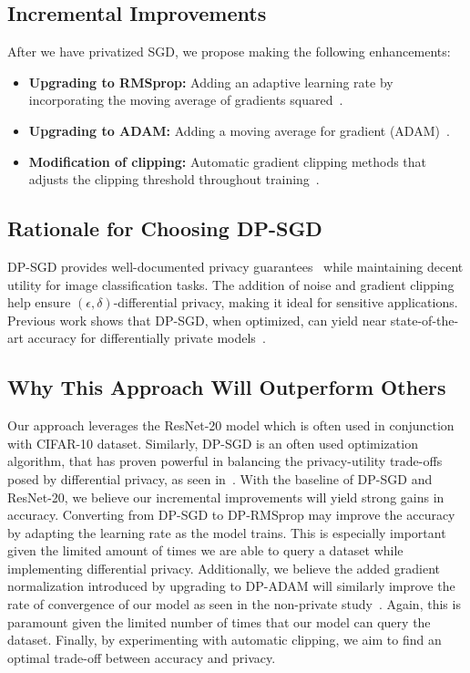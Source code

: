\subsection{Incremental Improvements}\label{subsec:incremental-improvements}
After we have privatized SGD, we propose making the following enhancements:
\begin{itemize}
    \item \textbf{Upgrading to RMSprop:} Adding an adaptive learning rate by incorporating the moving average of gradients squared~\cite{DBLP:journals/corr/abs-1807-06766}.
    \item \textbf{Upgrading to ADAM:} Adding a moving average for gradient (ADAM)~\cite{DBLP:journals/corr/abs-1807-06766}.
    \item \textbf{Modification of clipping:} Automatic gradient clipping methods that adjusts the clipping threshold throughout training~\cite{bu2023automaticclippingdifferentiallyprivate}.
\end{itemize}

\subsection{Rationale for Choosing DP-SGD}\label{subsec:rationale-for-choosing-dp-sgd}
DP-SGD provides well-documented privacy guarantees~\cite{Abadi_2016_DeepLearningDifferentialPrivacy}
while maintaining decent utility for image classification tasks.
The addition of noise and gradient clipping help ensure $(\epsilon, \delta)$-differential privacy,
making it ideal for sensitive applications.
Previous work shows that DP-SGD, when optimized, can yield near state-of-the-art accuracy
for differentially private models~\cite{De_2022_ScaleDP_ImageClassification}.

\subsection{Why This Approach Will Outperform Others}\label{subsec:why-this-approach-will-outperform-others}
Our approach leverages the ResNet-20 model which is often used in conjunction with
CIFAR-10 dataset.
Similarly, DP-SGD is an often used optimization algorithm, that has proven powerful in balancing the privacy-utility trade-offs posed
by differential privacy, as seen in~\cite{Abadi_2016_DeepLearningDifferentialPrivacy}.
With the baseline
of DP-SGD and ResNet-20, we believe our incremental improvements will yield strong gains in
accuracy.
Converting from DP-SGD to DP-RMSprop may improve the accuracy by adapting the learning rate as the
model trains.
This is especially important given the limited amount of times we are able to
query a dataset while implementing differential privacy.
Additionally, we believe the added gradient normalization introduced by upgrading to DP-ADAM will
similarly improve the rate of convergence of our model as seen in the non-private study~\cite{DBLP:journals/corr/abs-1807-06766}.
Again, this is paramount given the
limited number of times that our model can query the dataset.
Finally, by experimenting with automatic clipping, we aim to
find an optimal trade-off between accuracy and privacy.

